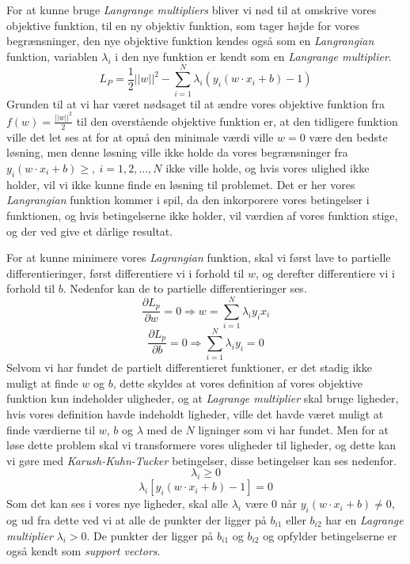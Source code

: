 \documentclass{article}
\begin{document}
For at kunne bruge \textit{Langrange multipliers} bliver vi nød til at omskrive vores objektive funktion, til en ny objektiv funktion, som tager højde for vores begrænsninger, den nye objektive funktion kendes også som en \textit{Langrangian} funktion, variablen $\lambda_i$ i den nye funktion er kendt som en \textit{Langrange multiplier}. 
$$L_P = \frac{1}{2}||w||^2 - \sum\limits_{i=1}^N \lambda_i (y_i(w \cdot x_i + b) - 1)$$
Grunden til at vi har været nødsaget til at ændre vores objektive funktion fra $f(w) = \frac{||w||^2}{2}$ til den overstående objektive funktion er, at den tidligere funktion ville det let ses at for at opnå den minimale værdi ville $w = 0$ være den bedste løsning, men denne løsning ville ikke holde da vores begrænsninger fra $y_i(w \cdot x_i + b) \geq, \ i =1,2,...,N$ ikke ville holde, og hvis vores ulighed ikke holder, vil vi ikke kunne finde en løsning til problemet. Det er her vores \textit{Langrangian} funktion kommer i spil, da den inkorporere vores betingelser i funktionen, og hvis betingelserne ikke holder, vil værdien af vores funktion stige, og der ved give et dårlige resultat.

For at kunne minimere vores \textit{Lagrangian} funktion, skal vi først lave to partielle differentieringer, først differentiere vi i forhold til $w$, og derefter differentiere vi i forhold til $b$. Nedenfor kan de to partielle differentieringer ses.
$$\frac{\partial L_p}{\partial w} = 0 \Rightarrow w = \sum\limits_{i=1}^N \lambda_i y_i x_i$$
$$\frac{\partial L_p}{\partial b} = 0 \Rightarrow \sum\limits_{i=1}^N \lambda_i y_i = 0$$
Selvom vi har fundet de partielt differentieret funktioner, er det stadig ikke muligt at finde $w$ og $b$, dette skyldes at vores definition af vores objektive funktion kun indeholder uligheder, og at \textit{Lagrange multiplier} skal bruge ligheder, hvis vores definition havde indeholdt ligheder, ville det havde været muligt at finde værdierne til $w$, $b$ og $\lambda$ med de $N$ ligninger som vi har fundet. Men for at løse dette problem skal vi transformere vores uligheder til ligheder, og dette kan vi gøre med \textit{Karush-Kuhn-Tucker} betingelser, disse betingelser kan ses nedenfor.
$$\lambda_i \geq 0$$
$$\lambda_i[y_i(w \cdot x_i + b) - 1] = 0$$
Som det kan ses i vores nye ligheder, skal alle $\lambda_i$ være $0$ når $y_i(w \cdot x_i + b) \neq 0$, og ud fra dette ved vi at alle de punkter der ligger på $b_{i1}$ eller $b_{i2}$ har en \textit{Lagrange multiplier} $\lambda_i > 0$.  De punkter der ligger på $b_{i1}$ og $b_{i2}$ og opfylder betingelserne er også kendt som \textit{support vectors}.
\end{document}

